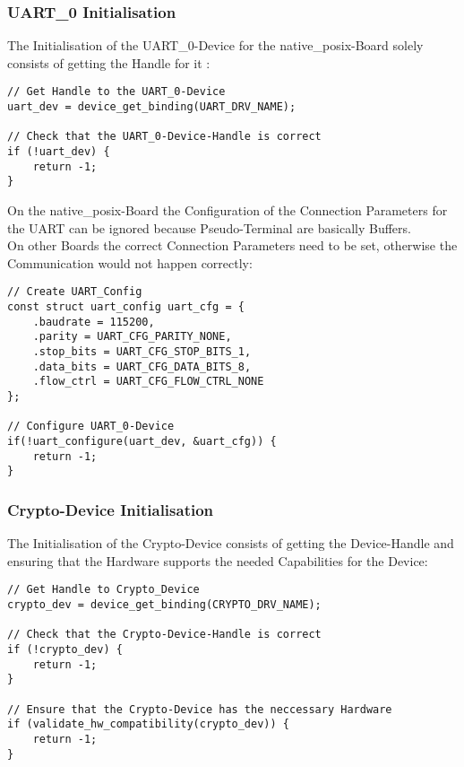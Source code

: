 \subsubsection{UART\_0 Initialisation}

The Initialisation of the UART\_0-Device for the native\_posix-Board
solely consists of getting the Handle for it :
\\
\begin{lstlisting}[style=CStyle,caption=UART 0 Initialisation]
// Get Handle to the UART_0-Device
uart_dev = device_get_binding(UART_DRV_NAME);

// Check that the UART_0-Device-Handle is correct
if (!uart_dev) {
	return -1;
}
\end{lstlisting}

\pagebreak

On the native\_posix-Board the Configuration of the Connection Parameters
for the UART can be ignored because Pseudo-Terminal are basically Buffers.
\\
On other Boards the correct Connection Parameters need to be set, otherwise
the Communication would not happen correctly:
\\
\begin{lstlisting}[style=CStyle, caption=UART-0 Configuration]
// Create UART_Config
const struct uart_config uart_cfg = {
	.baudrate = 115200,
	.parity = UART_CFG_PARITY_NONE,
	.stop_bits = UART_CFG_STOP_BITS_1,
	.data_bits = UART_CFG_DATA_BITS_8,
	.flow_ctrl = UART_CFG_FLOW_CTRL_NONE
};

// Configure UART_0-Device
if(!uart_configure(uart_dev, &uart_cfg)) {
	return -1;
}
\end{lstlisting}

\pagebreak

\subsubsection{Crypto-Device Initialisation}

The Initialisation of the Crypto-Device consists of getting the
Device-Handle and ensuring that the Hardware supports the
needed Capabilities for the Device:
\\
\begin{lstlisting}[style=CStyle,caption=Crypto-Device Initialisation]
// Get Handle to Crypto_Device
crypto_dev = device_get_binding(CRYPTO_DRV_NAME);

// Check that the Crypto-Device-Handle is correct
if (!crypto_dev) {
	return -1;
}

// Ensure that the Crypto-Device has the neccessary Hardware
if (validate_hw_compatibility(crypto_dev)) {
	return -1;
}
\end{lstlisting}


